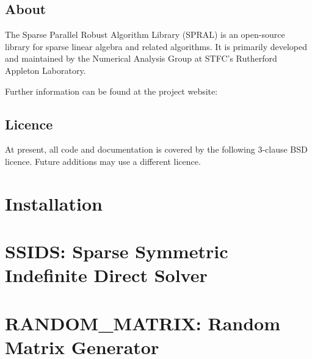 \documentclass{spralweb}
\begin{document}
\tableofcontents

\let\oldthesection\thesection
\renewcommand{\thesection}{}
\section{About}
The Sparse Parallel Robust Algorithm Library (SPRAL) is an open-source library
for sparse linear algebra and related algorithms. It is primarily developed and
maintained by the Numerical Analysis Group at STFC's Rutherford Appleton Laboratory.

\noindent
Further information can be found at the project website:

\section{Licence}
At present, all code and documentation is covered by the following 3-clause BSD
licence. Future additions may use a different licence.



\renewcommand{\thesection}{\oldthesection}

\chapter{Installation}

\chapter{SSIDS: Sparse Symmetric Indefinite Direct Solver}

\chapter{RANDOM\_MATRIX: Random Matrix Generator}

\end{document}
